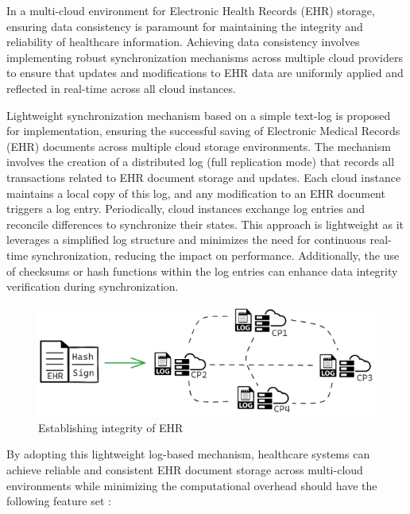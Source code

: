 \documentclass[runningheads]{llncs}
\begin{document}
In a multi-cloud environment for Electronic Health Records (EHR) storage, ensuring data consistency is paramount for maintaining the integrity and reliability of healthcare information. Achieving data consistency involves implementing robust synchronization mechanisms across multiple cloud providers to ensure that updates and modifications to EHR data are uniformly applied and reflected in real-time across all cloud instances. 

Lightweight synchronization mechanism based on a simple text-log is proposed for implementation, ensuring the successful saving of Electronic Medical Records (EHR) documents across multiple cloud storage environments. The mechanism involves the creation of a distributed log (full replication mode) that records all transactions related to EHR document storage and updates. Each cloud instance maintains a local copy of this log, and any modification to an EHR document triggers a log entry. Periodically, cloud instances exchange log entries and reconcile differences to synchronize their states. This approach is lightweight as it leverages a simplified log structure and minimizes the need for continuous real-time synchronization, reducing the impact on performance. Additionally, the use of checksums or hash functions within the log entries can enhance data integrity verification during synchronization. 

\vspace{-0.5cm}

\begin{figure}
\centerline{\includegraphics{img/step2.png}}
\caption{Establishing integrity of EHR}
\label{fig}
\end{figure}

\vspace{-0.5cm}

By adopting this lightweight log-based mechanism, healthcare systems can achieve reliable and consistent EHR document storage across multi-cloud environments while minimizing the computational overhead should have the following feature set : 
\end{document}
